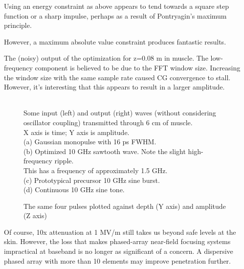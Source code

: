 \documentclass[paper.tex]{subfiles}
\begin{document}
Using an energy constraint as above appears to tend towards a square step function or a sharp impulse, perhaps as a result of Pontryagin's maximum principle\cite{Optimum1964}.


However, a maximum absolute value constraint produces fantastic results.


\begin{figure}[H]
	
	\caption{}
\end{figure}


The (noisy) output of the optimization for z=0.08 m in muscle. The low-frequency component is believed to be due to the FFT window size. Increasing the window size with the same sample rate caused CG convergence to stall. However, it's interesting that this appears to result in a larger amplitude. 


\begin{figure}[H]
	
	\caption{}
\end{figure}


\begin{figure}[H]
	
	\caption{\\
		Some input (left) and output (right) waves (without considering oscillator coupling) transmitted through 6 cm of muscle.\\
		X axis is time; Y axis is amplitude.\\
		(a) Gaussian monopulse with 16 ps FWHM.\\
		(b) Optimized 10 GHz sawtooth wave. Note the slight high-frequency ripple.\\ This has a frequency of approximately 1.5 GHz.\\
		(c) Prototypical precursor 10 GHz sine burst.\\
		(d) Continuous 10 GHz sine tone.
}
\end{figure}

\begin{figure}[H]
	
	\caption{The same four pulses plotted against depth (Y axis) and amplitude (Z axis)}
\end{figure}

Of course, 10x attenuation at 1 MV/m still takes us beyond safe levels at the skin. However, the loss that makes phased-array near-field focusing systems impractical at baseband is no longer as significant of a concern. A dispersive phased array with more than 10 elements may improve penetration further.
\end{document}
